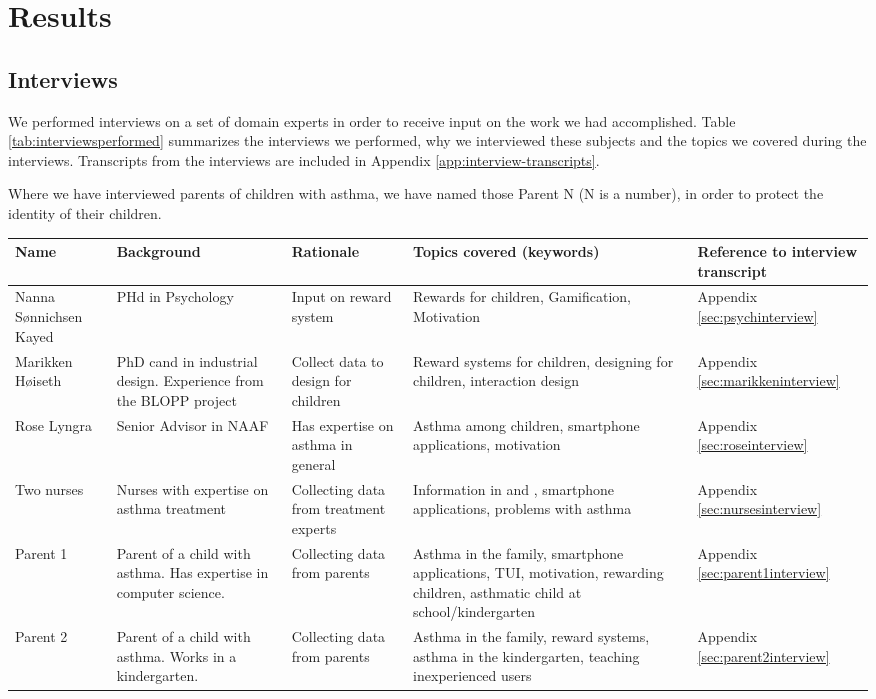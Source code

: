 \chapter{Results}
\label{chp:results}

\section{Interviews}
\label{sec:interviewresults}

We performed interviews on a set of domain experts in order to receive input on the work we had accomplished. Table \ref{tab:interviewsperformed} summarizes the interviews we performed, why we interviewed these subjects and the topics we covered during the interviews. Transcripts from the interviews are included in Appendix \ref{app:interview-transcripts}. 

Where we have interviewed parents of children with asthma, we have named those Parent N (N is a number), in order to protect the identity of their children.  

\begin{sidewaystable}
\centering
\begin{tabular}{| p{3.0cm} | p{4.0cm} | p{3.5cm} | p{6.0cm} | p{2.5cm} |}
	\hline
	\textbf{Name} & \textbf{Background} & \textbf{Rationale} & \textbf{Topics covered (keywords)} & \textbf{Reference to interview transcript} \\
	\hline
	Nanna S\o nnichsen Kayed & PHd in Psychology & Input on reward system & Rewards for children, Gamification, Motivation & Appendix \ref{sec:psychinterview} \\
	\hline
	Marikken H\o iseth & PhD cand in industrial design. Experience from the BLOPP project & Collect data to design for children & Reward systems for children, designing for children, interaction design & Appendix \ref{sec:marikkeninterview} \\
	\hline
	Rose Lyngra & Senior Advisor in NAAF & Has expertise on asthma in general & Asthma among children, smartphone applications, motivation & Appendix \ref{sec:roseinterview} \\
	\hline
	Two nurses & Nurses with expertise on asthma treatment & Collecting data from treatment experts &Information in \ab{} and \app{}, smartphone applications, problems with asthma & Appendix \ref{sec:nursesinterview} \\
	\hline
	Parent 1 & Parent of a child with asthma. Has expertise in computer science. & Collecting data from parents & Asthma in the family, smartphone applications, TUI, motivation, rewarding children, asthmatic child at school/kindergarten & Appendix \ref{sec:parent1interview} \\
	\hline
	Parent 2 & Parent of a child with asthma. Works in a kindergarten. & Collecting data from parents & Asthma in the family, reward systems, asthma in the kindergarten, teaching inexperienced users & Appendix \ref{sec:parent2interview} \\
	\hline     
\end{tabular}
\caption{Interviews performed during the project}
\label{tab:interviewsperformed}
\end{sidewaystable}  

